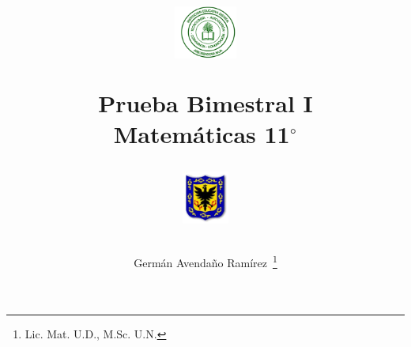 \documentclass[10pt,letterpaper,addpoints]{exam}
\begin{document}
\title{\begin{minipage}{.2\textwidth}
        \includegraphics[height=1.75cm]{Images/logo-colegio.png}
       \end{minipage}
\begin{minipage}{.55\textwidth}
 \begin{center}
 Prueba Bimestral I\\Matemáticas 11$^{\circ}$
\end{center}
\end{minipage}
\begin{minipage}{.2\textwidth}
\includegraphics[height=1.75cm]{Images/logo-sed.png} 
\end{minipage}
}
\author{Germ\'{a}n Avendaño Ram\'{i}rez~\thanks{Lic. Mat. U.D., M.Sc. U.N.}}
\date{}
\maketitle
\begin{center}
\end{center}
\vspace{0.1in}
\end{document}
